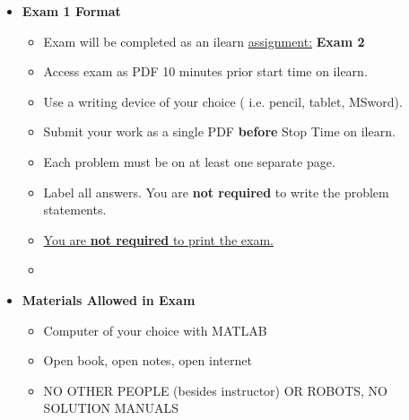 \documentclass[11pt]{article}
\newcommand{\EXAMNUM}{2}
\begin{document}
\begin{itemize}
             	\item  \textbf{\Large Exam 1\hspace{2mm} Format}
\begin{itemize}
		
			\item Exam will be completed as an ilearn \underline{assignment:} {\bf Exam  \EXAMNUM}  
			\item Access exam as PDF 10 minutes prior start time on ilearn.
			\item Use a writing device of your choice ( i.e. pencil, tablet, MSword).
			\item Submit your work as a single PDF {\bf before} Stop Time on ilearn.		 		\item Each problem must be on at least one separate page.
			\item Label all answers. You are {\bf not required} to write the problem statements.
			\item \underline{You are {\bf not required} to print the exam.}
			\item {}
\end{itemize}


		

		\item  \textbf{ Materials Allowed in Exam}

	\begin{itemize}

		\item  Computer of your choice with MATLAB
	
		\item  Open book, open notes, open internet
		
		\item  NO OTHER PEOPLE (besides instructor) OR ROBOTS, NO SOLUTION MANUALS\vspace{1mm}
		

\end{itemize}
\end{itemize}
\end{document}
